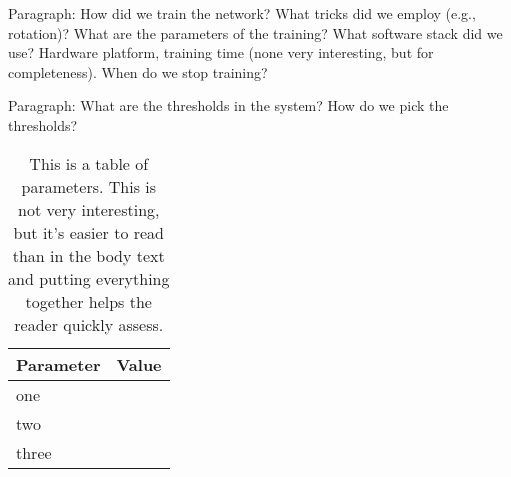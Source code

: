 Paragraph: How did we train the network? What tricks did we employ (e.g., rotation)? What are the parameters of the training? What software stack did we use? Hardware platform, training time (none very interesting, but for completeness). When do we stop training?

Paragraph: What are the thresholds in the system? How do we pick the thresholds?


\begin{table}
\begin{tabular}{ll}
\toprule
Parameter & Value \\
\midrule
one & \\
two & \\
three & \\
\bottomrule
\end{tabular}
\caption{This is a table of parameters. This is not very interesting, but it's easier to read than in the body text and putting everything together helps the reader quickly assess.}
\end{table}